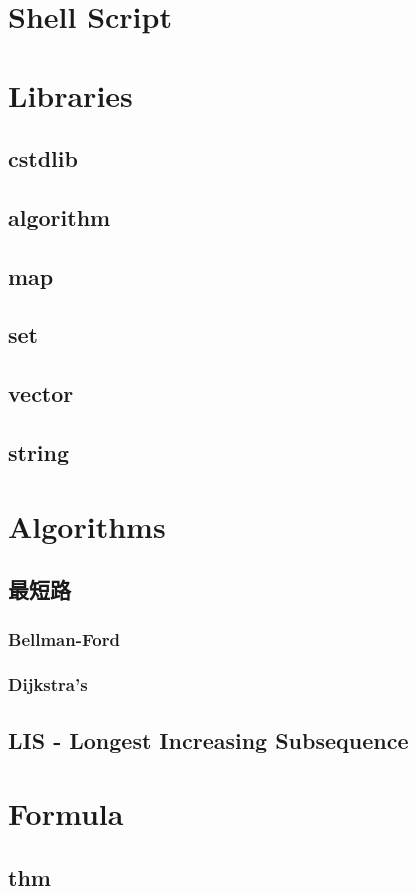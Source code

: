 \section{Shell Script}
    

\section{Libraries}
    \subsection{cstdlib}
        
    \subsection{algorithm}
        
    \subsection{map}
    \subsection{set}
    \subsection{vector}
    \subsection{string}

\section{Algorithms}
    \subsection{最短路}
        \subsubsection{Bellman-Ford}
        \subsubsection{Dijkstra’s}
    \subsection{LIS - Longest Increasing Subsequence}

\section{Formula}
    \subsection{thm}
        